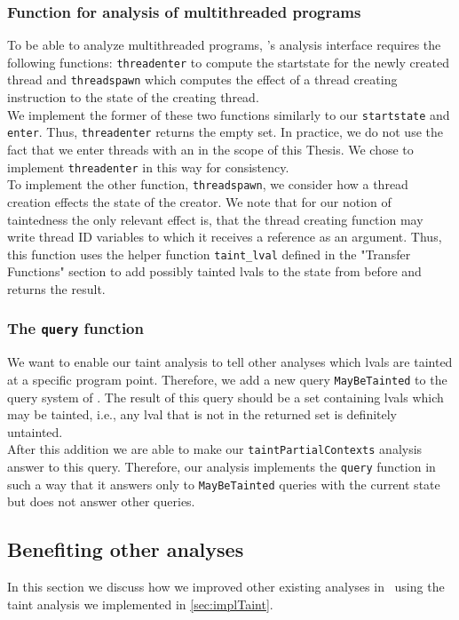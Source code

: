       \subsubsection{Function for analysis of multithreaded programs}
        To be able to analyze multithreaded programs, \gob's analysis interface requires the following functions: \texttt{threadenter} to compute the startstate for the newly created thread and \texttt{threadspawn} which computes the effect of a thread creating instruction to the state of the creating thread.\\
        We implement the former of these two functions similarly to our \texttt{startstate} and \texttt{enter}. Thus, \texttt{threadenter} returns the empty set. In practice, we do not use the fact that we enter threads with an in the scope of this Thesis. We chose to implement \texttt{threadenter} in this way for consistency.\\
        To implement the other function, \texttt{threadspawn}, we consider how a thread creation effects the state of the creator. We note that for our notion of taintedness the only relevant effect is, that the thread creating function may write thread ID variables to which it receives a reference as an argument. Thus, this function uses the helper function \texttt{taint\_lval} defined in the "Transfer Functions" section to add possibly tainted \ac{lval}s to the state from before and returns the result.

      \subsubsection{The \texttt{query} function}
        We want to enable our taint analysis to tell other analyses which \ac{lval}s are tainted at a specific program point. Therefore, we add a new query \texttt{MayBeTainted} to the query system of \gob. The result of this query should be a set containing \ac{lval}s which may be tainted, i.e., any \ac{lval} that is not in the returned set is definitely untainted.\\
        After this addition we are able to make our \texttt{taintPartialContexts} analysis answer to this query. Therefore, our analysis implements the \texttt{query} function in such a way that it answers only to \texttt{MayBeTainted} queries with the current state but does not answer other queries.

    \subsection{Benefiting other analyses}\label{sec:improveVariableAnalyses}
    In this section we discuss how we improved other existing analyses in \gob\ using the taint analysis we implemented in \autoref{sec:implTaint}.
